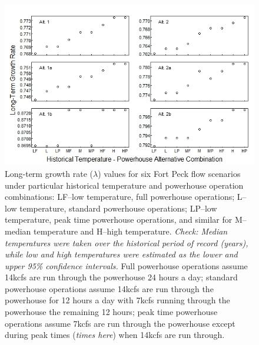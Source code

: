 \documentclass[12pt]{article}
\begin{document}
\begin{figure}[h]
\centering
\hspace*{-0.5in}\includegraphics[width=7.5in]{NEPA_Fig_9-Year85-SA}
\caption{Long-term growth rate ($\lambda$) values for six Fort Peck flow scenarios under particular historical temperature and powerhouse operation combinations: LF--low temperature, full powerhouse operations; L--low temperature, standard powerhouse operations; LP--low temperature, peak time powerhouse operations, and similar for M--median temperature and H--high temperature.  \textit{Check:  Median temperatures were taken over the historical period of record (years), while low and high temperatures were estimated as the lower and upper 95\% confidence intervals.} Full powerhouse operations assume 14kcfs are run through the powerhouse 24 hours a day; standard powerhouse operations assume 14kcfs are run through the powerhouse for 12 hours a day with 7kcfs running through the powerhouse the remaining 12 hours; peak time powerhouse operations assume 7kcfs are run through the powerhouse except during peak times (\textit{times here}) when 14kcfs are run through.}
\label{SA85}
\end{figure}
\end{document}
